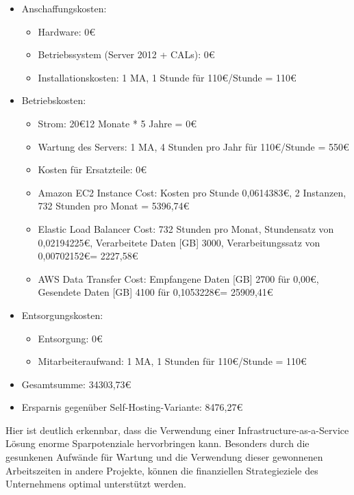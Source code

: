 \begin{itemize}
  \item Anschaffungskosten:
  	\begin{itemize}
  	  \item Hardware: 0\euro
  	  \item Betriebssystem (Server 2012 + CALs): 0\euro
  	  \item Installationskosten: 1 MA, 1 Stunde für 110\euro/Stunde = 110\euro
  	\end{itemize}
  \item Betriebskosten:
  	\begin{itemize}
  	  \item Strom: 20\euro * 12 Monate * 5 Jahre = 0\euro
  	  \item Wartung des Servers: 1 MA, 4 Stunden pro Jahr für 110\euro/Stunde =
  	  550\euro
  	  \item Kosten für Ersatzteile: 0\euro
  	  \item Amazon EC2 Instance Cost: Kosten pro Stunde 0,0614383\euro, 2
  	  Instanzen, 732 Stunden pro Monat = 5396,74\euro
  	  \item Elastic Load Balancer Cost: 732 Stunden pro Monat, Stundensatz von
  	  0,02194225\euro, Verarbeitete Daten [GB] 3000, Verarbeitungssatz von
  	  0,00702152\euro = 2227,58\euro
  	  \item AWS Data Transfer Cost: Empfangene Daten [GB] 2700 für 0,00\euro,
  	  Gesendete Daten [GB] 4100 für 0,1053228\euro = 25909,41\euro
  	\end{itemize}
  \item Entsorgungskosten:
  	\begin{itemize}
  	  \item Entsorgung: 0\euro
  	  \item Mitarbeiteraufwand: 1 MA, 1 Stunden für 110\euro/Stunde = 110\euro
  	\end{itemize}
  \item Gesamtsumme: 34303,73\euro
  \item Ersparnis gegenüber Self-Hosting-Variante: 8476,27\euro
\end{itemize}
Hier ist deutlich erkennbar, dass die Verwendung einer
Infrastructure-as-a-Service Lösung enorme Sparpotenziale hervorbringen kann.
Besonders durch die gesunkenen Aufwände für Wartung und die Verwendung dieser
gewonnenen Arbeitszeiten in andere Projekte, können die finanziellen
Strategieziele des Unternehmens optimal unterstützt werden.
